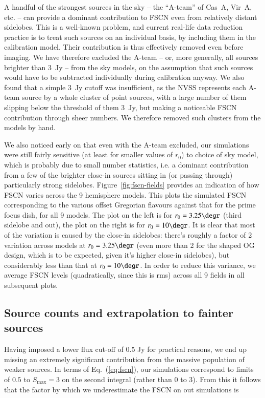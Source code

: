 \documentclass{aa}
\begin{document}
A handful of the strongest sources in the sky -- the ``A-team'' of  Cas~A, Vir~A, etc. -- can provide a dominant contribution to FSCN even from relatively distant sidelobes. This is a well-known problem, and current real-life data reduction practice is to treat such sources on an individual basis, by including them in the calibration model. Their contribution is thus effectively removed even before imaging. We have therefore excluded the A-team -- or, more generally, all sources brighter than 3~Jy -- from the sky models, on the assumption that such sources would have to be subtracted individually during calibration anyway. We also found that a simple 3~Jy cutoff was insufficient, as the NVSS represents each A-team source by a whole cluster of point sources, with a large number of them slipping below the threshold of them 3~Jy, but making a noticeable FSCN contribution through sheer numbers. We therefore removed such clusters from the models by hand.

We also noticed early on that even with the A-team excluded, our simulations were still fairly sensitive (at least for smaller values of $r_0$) to choice of sky model, which is probably due to small number statistics, i.e. a dominant contribution from a few of the brighter close-in sources sitting in (or passing through) particularly strong sidelobes. Figure~\ref{fig:fscn-fields} provides an indication of how FSCN varies across the 9 hemisphere models. This plots the simulated FSCN corresponding to the various offset Gregorian flavours against that for the prime focus dish, for all 9 models. The plot on the left is for $r_0=3.25\degr$ (third sidelobe and out), the plot on the right is for $r_0=10\degr$. It is clear that most of the variation is caused by the close-in sidelobes: there's roughly a factor of 2 variation across models at $r_0=3.25\degr$ (even more than 2 for the shaped OG design, which is to be expected, given it's higher close-in sidelobes), but considerably less than that at $r_0=10\degr$. In order to reduce this variance, we average FSCN levels (quadratically, since this is rms) across all 9 fields in all subsequent plots.

\subsection{Source counts and extrapolation to fainter sources}
\label{sec:source-counts}
Having imposed a lower flux cut-off of 0.5 Jy for practical reasons, we end up missing an extremely significant contribution from the massive population of weaker sources. In terms of Eq.~(\ref{eq:fscn}), our simulations correspond to limits of $0.5$ to $S_\mathrm{max}=3$ on the second integral (rather than $0$ to $3$). From this it follows that the factor by which we underestimate the FSCN on out simulations is
\end{document}

